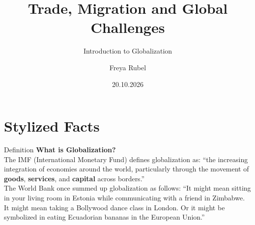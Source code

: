 \documentclass{beamer}
\author{Freya Rubel}
\title{Trade, Migration and Global Challenges}
\subtitle{Introduction to Globalization}
\institute{}
\date{20.10.2026}
\begin{document}
\begin{frame}
    \titlepage
\end{frame}

\begin{frame}
    \tableofcontents[sectionstyle=show, subsectionstyle=show/shaded/hide, subsubsectionstyle=show/shaded/hide]
\end{frame}

\section{Stylized Facts}

\begin{frame}{Definition}
    \textbf{What is Globalization?} \vspace{0.5cm} \\
    \pause
The IMF (International Monetary Fund) defines globalization as: “the increasing integration of economies around the world, particularly through the movement of \textbf{goods}, \textbf{services}, and \textbf{capital} across borders.”
\vspace{0.2cm}\\
\pause
The World Bank once summed up globalization as follows: “It might mean sitting in your living room in Estonia while communicating with a friend in Zimbabwe. It might mean taking a Bollywood dance class in London. Or it might be symbolized in eating Ecuadorian bananas in the European Union.”
\end{frame}
\end{document}
